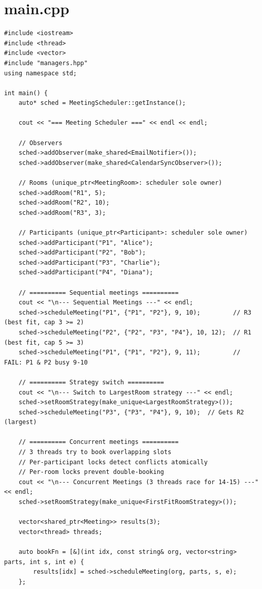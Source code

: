 \documentclass[11pt,a4paper]{article}
\begin{document}
\section{main.cpp}
\begin{lstlisting}[title={\texttt{main.cpp}}]
#include <iostream>
#include <thread>
#include <vector>
#include "managers.hpp"
using namespace std;

int main() {
    auto* sched = MeetingScheduler::getInstance();

    cout << "=== Meeting Scheduler ===" << endl << endl;

    // Observers
    sched->addObserver(make_shared<EmailNotifier>());
    sched->addObserver(make_shared<CalendarSyncObserver>());

    // Rooms (unique_ptr<MeetingRoom>: scheduler sole owner)
    sched->addRoom("R1", 5);
    sched->addRoom("R2", 10);
    sched->addRoom("R3", 3);

    // Participants (unique_ptr<Participant>: scheduler sole owner)
    sched->addParticipant("P1", "Alice");
    sched->addParticipant("P2", "Bob");
    sched->addParticipant("P3", "Charlie");
    sched->addParticipant("P4", "Diana");

    // ========== Sequential meetings ==========
    cout << "\n--- Sequential Meetings ---" << endl;
    sched->scheduleMeeting("P1", {"P1", "P2"}, 9, 10);         // R3 (best fit, cap 3 >= 2)
    sched->scheduleMeeting("P2", {"P2", "P3", "P4"}, 10, 12);  // R1 (best fit, cap 5 >= 3)
    sched->scheduleMeeting("P1", {"P1", "P2"}, 9, 11);         // FAIL: P1 & P2 busy 9-10

    // ========== Strategy switch ==========
    cout << "\n--- Switch to LargestRoom strategy ---" << endl;
    sched->setRoomStrategy(make_unique<LargestRoomStrategy>());
    sched->scheduleMeeting("P3", {"P3", "P4"}, 9, 10);  // Gets R2 (largest)

    // ========== Concurrent meetings ==========
    // 3 threads try to book overlapping slots
    // Per-participant locks detect conflicts atomically
    // Per-room locks prevent double-booking
    cout << "\n--- Concurrent Meetings (3 threads race for 14-15) ---" << endl;
    sched->setRoomStrategy(make_unique<FirstFitRoomStrategy>());

    vector<shared_ptr<Meeting>> results(3);
    vector<thread> threads;

    auto bookFn = [&](int idx, const string& org, vector<string> parts, int s, int e) {
        results[idx] = sched->scheduleMeeting(org, parts, s, e);
    };


\end{lstlisting}
\end{document}
